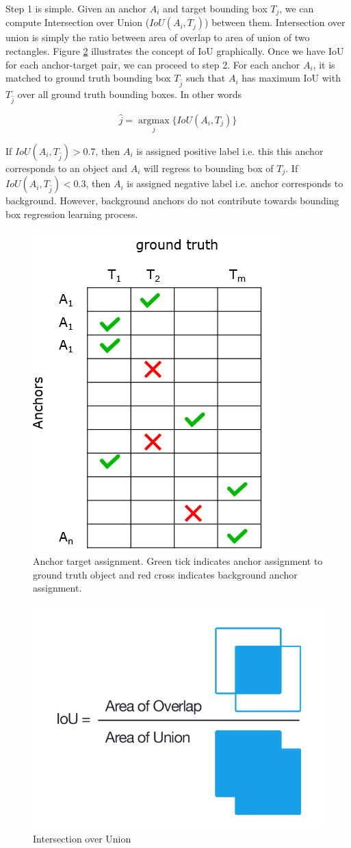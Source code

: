 Step 1 is simple. Given an anchor $A_i$ and target bounding box $T_j$, we can compute Intersection over Union ($IoU(A_i,T_j)$) between them. Intersection over union is simply the ratio between area of overlap to area of union of two rectangles. Figure \ref{fig:iou} illustrates the concept of IoU graphically. Once we have IoU for each anchor-target pair, we can proceed to step 2. For each anchor $A_i$, it is matched to ground truth bounding box $T_{\hat{j}}$ such that $A_i$ has maximum IoU with $T_{\hat{j}}$ over all ground truth bounding boxes. In other words

$$ \hat{j} = \operatorname*{argmax}_{j} \{ IoU(A_i,T_j) \} $$

If $IoU(A_i,T_{\hat{j}}) > 0.7$, then $A_i$ is assigned positive label i.e. this this anchor corresponds to an object and $A_i$ will regress to bounding box of $T_j$. If $IoU(A_i,T_{\hat{j}}) < 0.3$, then $A_i$ is assigned negative label i.e. anchor corresponds to background. However, background anchors do not contribute towards bounding box regression learning process. 

\begin{figure}
    \centering
    \includegraphics[width=0.5\linewidth]{images/anchor-targets.PNG}
    \caption[Anchor target assignment]{Anchor target assignment. Green tick indicates anchor assignment to ground truth object and red cross indicates background anchor assignment.}
    \label{fig:anchor-targets}
\end{figure}


\begin{figure}
    \centering
    \includegraphics[width=0.5\linewidth]{images/iou.PNG}
    \caption{Intersection over Union}
    \label{fig:iou}
\end{figure}



